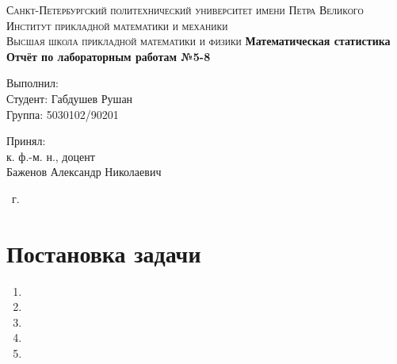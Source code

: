 \documentclass[14pt,a4paper,article]{ncc}
\begin{document}
\begin{titlepage}
    \begin{center}
        \textsc{
            Санкт-Петербургский политехнический университет имени Петра Великого \\[5mm]
            Институт прикладной математики и механики\\[2mm]
            Высшая школа прикладной математики и физики
        }
        \vfill
        \textbf{\large
            Математическая статистика\\
            Отчёт по лабораторным работам №5-8 \\[3mm]
        }
    \end{center}

    \vfill
    \hfill
    \begin{minipage}{0.5\textwidth}
        Выполнил: \\[2mm]
		Студент: Габдушев Рушан \\
		Группа: 5030102/90201\\
    \end{minipage}

	\hfill
	\begin{minipage}{0.5\textwidth}
		Принял: \\[2mm]
		к. ф.-м. н., доцент \\
		Баженов Александр Николаевич
	\end{minipage}

    \vfill
    \begin{center}
        \theyear\ г.
    \end{center}
\end{titlepage}

\tableofcontents
\newpage
\listoffigures
\newpage
\listoftables
\newpage

\section{Постановка задачи}
\label{sec:problem}
\begin{enumerate}
    \item %
    \item %
    \item %
    \item %
    \item %
\end{enumerate}
\newpage
\end{document}
